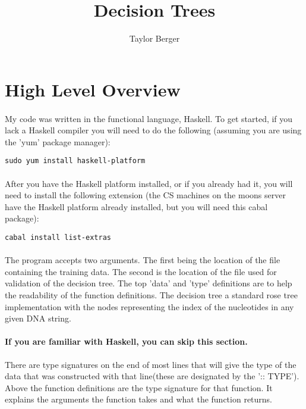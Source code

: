 \documentclass[12pt]{article}
\begin{document}
\title{Decision Trees}
\author{Taylor Berger}
\maketitle

\section{High Level Overview}
\paragraph{}My code was written in the functional language, Haskell. To get started, if you lack a Haskell compiler you will need to do the following (assuming you are using the 'yum' package manager):
\begin{verbatim}
sudo yum install haskell-platform
\end{verbatim}
\paragraph{}After you have the Haskell platform installed, or if you already had it, you will need to install the following extension (the CS machines on the moons server have the Haskell platform already installed, but you will need this cabal package):
\begin{verbatim}
cabal install list-extras
\end{verbatim}
\paragraph{}The program accepts two arguments. The first being the location of the file containing the training data. The second is the location of the file used for validation of the decision tree. The top 'data' and 'type' definitions are to help the readability of the function definitions. The decision tree a standard rose tree implementation with the nodes representing the index of the nucleotides in any given DNA string. 

\paragraph{If you are familiar with Haskell, you can skip this section.} There are type signatures on the end of most lines that will give the type of the data that was constructed with that line(these are designated by the ':: TYPE'). Above the function definitions are the type signature for that function. It explains the arguments the function takes and what the function returns.
\end{document}
